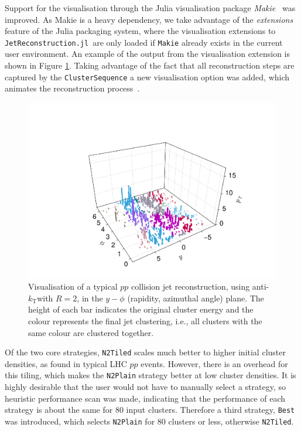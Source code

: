 \documentclass{webofc}
\newcommand{\akt}{anti-${k}_\text{T}$}
\newcommand{\JR}{\texttt{JetReconstruction.jl}}
\begin{document}
Support for the visualisation through the Julia visualisation package
\emph{Makie}~\cite{Danisch2021} was improved. As Makie is a heavy dependency, we
take advantage of the \emph{extensions} feature of the Julia packaging system,
where the visualisation extensions to \JR\ are only loaded if \texttt{Makie}
already exists in the current user environment. An example of the output from
the visualisation extension is shown in Figure \ref{fig:jetvisplot}. Taking
advantage of the fact that all reconstruction steps are captured by the
\texttt{ClusterSequence} a new visualisation option was added, which animates
the reconstruction process~\cite{jetrecoAnimationCHEP2024}.

\begin{figure}[h]
    \begin{center}
        \includegraphics[width=0.6\linewidth]{jetvis-5-compact.pdf}
        \caption{Visualisation of a typical $pp$ collision jet reconstruction, using \akt with $R=2$, in the $y-\phi$ (rapidity, azimuthal angle) plane. The height of each bar indicates the original cluster energy and the colour represents the final jet clustering, i.e., all clusters with the same colour are clustered together.}
        \label{fig:jetvisplot}
    \end{center}
\end{figure}

Of the two core strategies, \texttt{N2Tiled} scales much better to higher
initial cluster densities, as found in typical LHC $pp$ events. However, there
is an overhead for this tiling, which makes the \texttt{N2Plain} strategy better
at low cluster densities. It is highly desirable that the user would not have to
manually select a strategy, so heuristic performance scan was made, indicating
that the performance of each strategy is about the same for 80 input clusters.
Therefore a third strategy, \texttt{Best} was introduced, which selects
\texttt{N2Plain} for 80 clusters or less, otherwise \texttt{N2Tiled}.
\end{document}
